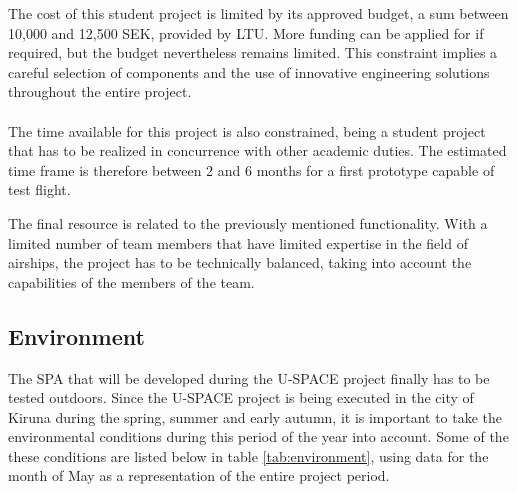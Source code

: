 \noindent
The cost of this student project is limited by its approved budget, a sum between 10,000 and 12,500 SEK, provided by \ac{LTU}. More funding can be applied for if required, but the budget nevertheless remains limited. This constraint implies a careful selection of components and the use of innovative engineering solutions throughout the entire project. 
\\
\\
The time available for this project is also constrained, being a student project that has to be realized in concurrence with other academic duties. The estimated time frame is therefore between 2 and 6 months for a first prototype capable of test flight.

\pagebreak

\noindent
The final resource is related to the previously mentioned functionality. With a limited number of team members that have limited expertise in the field of airships, the project has to be technically balanced, taking into account the capabilities of the members of the team.

\subsection{Environment}

The \ac{SPA} that will be developed during the \ac{U-SPACE} project finally has to be tested outdoors. Since the \ac{U-SPACE} project is being executed in the city of Kiruna during the spring, summer and early autumn, it is important to take the environmental conditions during this period of the year into account.  Some of the these conditions are listed below in table \ref{tab:environment}, using data for the month of May \cite{website:weatherspark} as a representation of the entire project period.

\begin{table}[H]
\centering
\caption{Environmental conditions}
\label{tab:environment}
\end{table}

